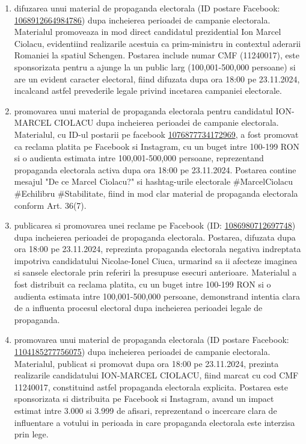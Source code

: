 \documentclass[a4paper,12pt]{article}
\begin{document}
\begin{enumerate}[leftmargin=*, label=\arabic*.)]
    \item difuzarea unui material de propaganda electorala (ID postare Facebook: \href{https://www.facebook.com/ads/library/?id=1068912664984786}{1068912664984786}) dupa incheierea perioadei de campanie electorala. Materialul promoveaza in mod direct candidatul prezidential Ion Marcel Ciolacu, evidentiind realizarile acestuia ca prim-ministru in contextul aderarii Romaniei la spatiul Schengen. Postarea include numar CMF (11240017), este sponsorizata pentru a ajunge la un public larg (100,001-500,000 persoane) si are un evident caracter electoral, fiind difuzata dupa ora 18:00 pe 23.11.2024, incalcand astfel prevederile legale privind incetarea campaniei electorale.
    \item promovarea unui material de propaganda electorala pentru candidatul ION-MARCEL CIOLACU dupa incheierea perioadei de campanie electorala. Materialul, cu ID-ul postarii pe facebook \href{https://www.facebook.com/ads/library/?id=1076877734172969}{1076877734172969}, a fost promovat ca reclama platita pe Facebook si Instagram, cu un buget intre 100-199 RON si o audienta estimata intre 100,001-500,000 persoane, reprezentand propaganda electorala activa dupa ora 18:00 pe 23.11.2024. Postarea contine mesajul "De ce Marcel Ciolacu?" si hashtag-urile electorale \#MarcelCiolacu \#Echilibru \#Stabilitate, fiind in mod clar material de propaganda electorala conform Art. 36(7).
    \item publicarea si promovarea unei reclame pe Facebook (ID: \href{https://www.facebook.com/ads/library/?id=1086980712697748}{1086980712697748}) dupa incheierea perioadei de propaganda electorala. Postarea, difuzata dupa ora 18:00 pe 23.11.2024, reprezinta propaganda electorala negativa indreptata impotriva candidatului Nicolae-Ionel Ciuca, urmarind sa ii afecteze imaginea si sansele electorale prin referiri la presupuse esecuri anterioare. Materialul a fost distribuit ca reclama platita, cu un buget intre 100-199 RON si o audienta estimata intre 100,001-500,000 persoane, demonstrand intentia clara de a influenta procesul electoral dupa incheierea perioadei legale de propaganda.
    \item promovarea unui material de propaganda electorala (ID postare Facebook: \href{https://www.facebook.com/ads/library/?id=1104185277756075}{1104185277756075}) dupa incheierea perioadei de campanie electorala. Materialul, publicat si promovat dupa ora 18:00 pe 23.11.2024, prezinta realizarile candidatului ION-MARCEL CIOLACU, fiind marcat cu cod CMF 11240017, constituind astfel propaganda electorala explicita. Postarea este sponsorizata si distribuita pe Facebook si Instagram, avand un impact estimat intre 3.000 si 3.999 de afisari, reprezentand o incercare clara de influentare a votului in perioada in care propaganda electorala este interzisa prin lege.

\end{enumerate}
\end{document}
